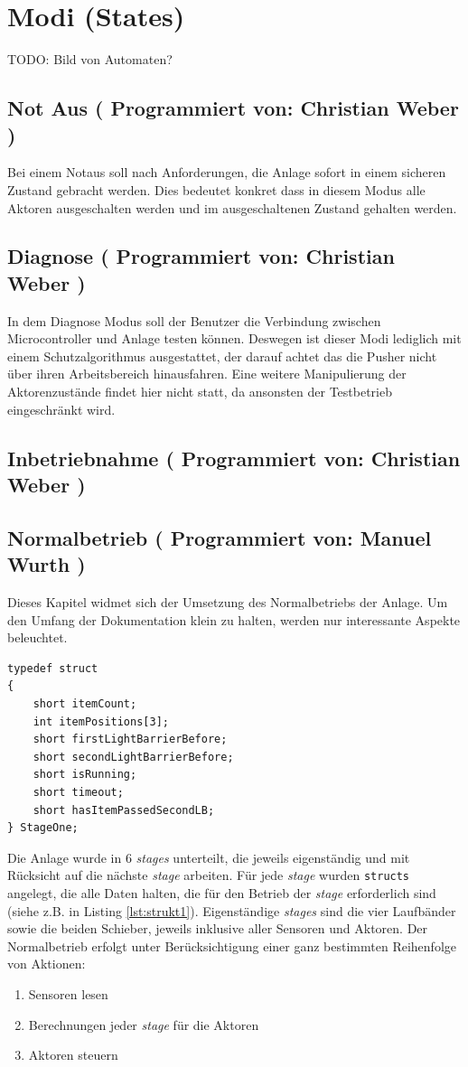 \documentclass[fontsize=11pt,a4paper,final]{scrartcl}[2003/01/01]
\newcommand*{\manu}{%
	Programmiert von: Manuel Wurth
}
\newcommand*{\chris}{%
	Programmiert von: Christian Weber
}
\begin{document}
\section{Modi (States)}
TODO: Bild von Automaten?
\subsection{Not Aus (\chris)}
Bei einem Notaus soll nach Anforderungen, die Anlage sofort in einem sicheren Zustand gebracht werden. Dies bedeutet konkret dass in diesem Modus alle Aktoren ausgeschalten werden und im ausgeschaltenen Zustand gehalten werden.

\subsection{Diagnose (\chris)}
In dem Diagnose Modus soll der Benutzer die Verbindung zwischen Microcontroller und Anlage testen können. Deswegen ist dieser Modi lediglich mit einem Schutzalgorithmus ausgestattet, der darauf achtet das die Pusher nicht über ihren Arbeitsbereich hinausfahren. Eine weitere Manipulierung der Aktorenzustände findet hier nicht statt, da ansonsten der Testbetrieb eingeschränkt wird.

\subsection{Inbetriebnahme (\chris)}


\subsection{Normalbetrieb (\manu)}
Dieses Kapitel widmet sich der Umsetzung des Normalbetriebs der Anlage. Um den Umfang der Dokumentation klein zu halten, werden nur interessante Aspekte beleuchtet.
\begin{lstlisting}[caption={Beispiel: Struct für die erste \textit{stage} (erstes Laufband)},label={lst:strukt1}]
typedef struct
{
	short itemCount;
	int itemPositions[3];
	short firstLightBarrierBefore;
	short secondLightBarrierBefore;
	short isRunning;
	short timeout;
	short hasItemPassedSecondLB;
} StageOne;
\end{lstlisting} 
Die Anlage wurde in 6 \textit{stages} unterteilt, die jeweils eigenständig und mit Rücksicht auf die nächste \textit{stage} arbeiten. Für jede \textit{stage} wurden \lstinline|structs| angelegt, die alle Daten halten, die für den Betrieb der \textit{stage} erforderlich sind (siehe z.B. in Listing \ref{lst:strukt1}). Eigenständige \textit{stages} sind die vier Laufbänder sowie die beiden Schieber, jeweils inklusive aller Sensoren und Aktoren. Der Normalbetrieb erfolgt unter Berücksichtigung einer ganz bestimmten Reihenfolge von Aktionen:
\begin{enumerate}
\item Sensoren lesen
\item Berechnungen jeder \textit{stage} für die Aktoren
\item Aktoren steuern
\end{enumerate}
\end{document}
